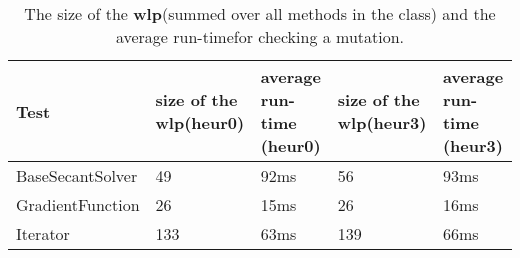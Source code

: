 \documentclass[a4paper, fleqn]{article}
\newcommand{\wlp}{\textbf{wlp}\xspace}
\begin{document}
\begin{table}
    \begin{tabular}{ | p{2.4cm} | p{1.9cm} | p{1.9cm} | p{1.9cm} | p{1.9cm} |}
    \hline
    Test & size of the \wlp (heur0) & average run-time (heur0) & size of the \wlp (heur3) & average run-time (heur3) \\ \hline
    BaseSecantSolver & 49 & 92ms & 56 & 93ms \\ \hline
    GradientFunction & 26 & 15ms & 26 & 16ms \\ \hline
    Iterator & 133 & 63ms & 139 & 66ms \\ \hline
    \end{tabular}
\caption[]{The size of the \wlp (summed over all methods in the class) and the average run-time\footnotemark for checking a mutation.}
\label{runtime}
\end{table}
\end{document}
